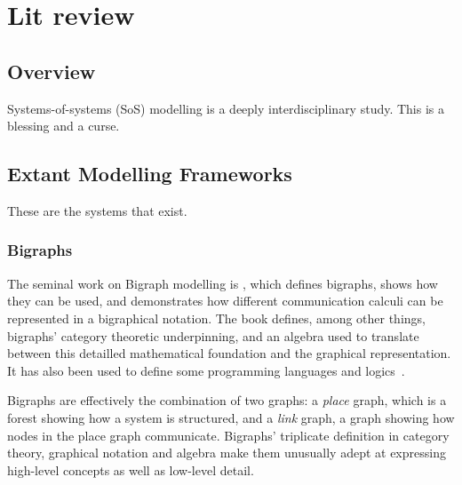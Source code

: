\chapter{Lit review}

\section{Overview}

Systems-of-systems (SoS) modelling is a deeply interdisciplinary study. This is a blessing and a curse.
\par


\section{Extant Modelling Frameworks}
These are the systems that exist.


\subsection{Bigraphs}

The seminal work on Bigraph modelling is \cite{milner2009space}, which defines
bigraphs, shows how they can be used, and demonstrates how different
communication calculi can be represented in a bigraphical notation. The book
defines, among other things, bigraphs' category theoretic underpinning, and an
algebra used to translate between this detailled mathematical foundation and the
graphical representation. It has also been used to define some programming
languages and
logics~\cite{Perrone:2012:MCB:2245276.2231985,sevegnani2015bigraphs}.
\par

Bigraphs are effectively the combination of two graphs: a \emph{place} graph,
which is a forest showing how a system is structured, and a \emph{link} graph, a
graph showing how nodes in the place graph communicate. Bigraphs' triplicate
definition in category theory, graphical notation and algebra make them
unusually adept at expressing high-level concepts as well as low-level detail.
\par

